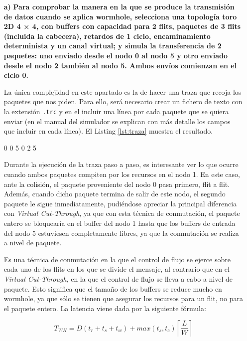 \begin{itemize}
    \item[\textbf{a)}] \textbf{Para comprobar la manera en la que se produce la transmisión de datos cuando se aplica wormhole, selecciona una topología toro 2D 4 × 4, con buffers con capacidad para 2 flits, paquetes de 3 flits (incluida la cabecera), retardos de 1 ciclo, encaminamiento determinista y un canal virtual; y simula la transferencia de 2 paquetes: uno enviado desde el nodo 0 al nodo 5 y otro enviado desde el nodo 2 también al nodo 5. Ambos envíos comienzan en el ciclo 0.}

    La única complejidad en este apartado es la de hacer una traza que recoja los paquetes que nos piden. Para ello, será necesario crear un fichero de texto con la extensión \verb|.trc| y en el incluir una línea por cada paquete que se quiera enviar (en el manual del simulador se explican con más detalle los campos que incluir en cada línea). El Listing \ref{lst:traza} muestra el resultado.

    \begin{mycode}[style=mycodestyle, caption={Traza a simular.}, label=lst:traza]
0 0 5
0 2 5
    \end{mycode}

    Durante la ejecución de la traza paso a paso, es interesante ver lo que ocurre cuando ambos paquetes compiten por los recursos en el nodo 1. En este caso, ante la colisión, el paquete proveniente del nodo 0 pasa primero, flit a flit. Además, cuando dicho paquete termina de salir de este nodo, el segundo paquete le sigue inmediatamente, pudiéndose apreciar la principal diferencia con \textit{Virtual Cut-Through}, ya que con esta técnica de conmutación, el paquete entero se bloquearía en el buffer del nodo 1 hasta que los buffers de entrada del nodo 5 estuviesen completamente libres, ya que la conmutación se realiza a nivel de paquete.

    \begin{keyconceptbox}[Wormhole]
        Es una técnica de conmutación en la que el control de flujo se ejerce sobre cada uno de los flits en los que se divide el mensaje, al contrario que en el \textit{Virtual Cut-Through}, en la que el control de flujo se lleva a cabo a nivel de paquete. Esto significa que el tamaño de los buffers se reduce mucho en wormhole, ya que sólo se tienen que asegurar los recursos para un flit, no para el paquete entero. La latencia viene dada por la siguiente fórmula:

        \begin{equation*}
        T_{WH} = D(t_r + t_s + t_w) + max(t_s,t_c)\left\lceil\frac{L}{W}\right\rceil
        \end{equation*}
        

\end{keyconceptbox}
\end{itemize}
